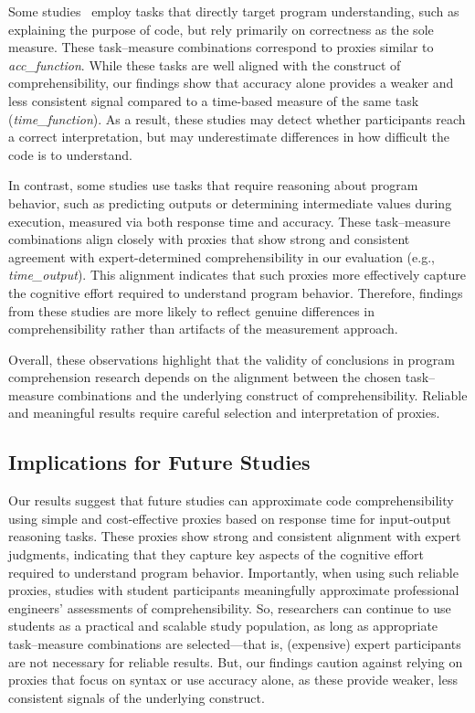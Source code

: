 Some studies~\cite{S24, S35, S38} employ tasks that directly target program
understanding, such as explaining the purpose of code, but rely
primarily on correctness as the sole measure. These task–measure
combinations correspond to proxies similar to \emph{acc\_function}.
While these tasks are well aligned with the construct of
comprehensibility, our findings show that accuracy alone provides
a weaker and less consistent signal compared to a time-based measure
of the same task (\ie \emph{time\_function}).
As a result, these studies may
detect whether participants reach a correct interpretation, but
may underestimate differences in how difficult the code is to
understand.

In contrast, some studies \cite{S39, S48, S50, S57, S59, S60} 
use tasks that require reasoning
about program behavior, such as predicting outputs or determining
intermediate values during execution, measured via both response
time and accuracy.
These task–measure combinations align closely with proxies that
show strong and consistent agreement with expert-determined
comprehensibility in our evaluation (e.g., \emph{time\_output}).
This alignment indicates that such proxies more effectively capture
the cognitive effort required to understand program behavior.
Therefore, findings from these studies are more likely to reflect
genuine differences in comprehensibility rather than artifacts of
the measurement approach.

Overall, these observations highlight that the validity of conclusions
in program comprehension research depends on the
alignment between the chosen task–measure combinations and the
underlying construct of comprehensibility.
Reliable and meaningful results require careful selection and interpretation of proxies.


\subsection{Implications for Future Studies}
\label{sec:future-work}

Our results suggest that future studies can approximate code
comprehensibility using simple and cost-effective proxies
based on response time for input-output
reasoning tasks. These proxies show strong and consistent
alignment with expert judgments, indicating that they capture
key aspects of the cognitive effort required to understand
program behavior.
Importantly, when using such reliable proxies, studies with
student participants meaningfully approximate
professional engineers’ assessments of comprehensibility. So,
researchers can continue to use students as a practical and scalable
study population, as long as appropriate task–measure
combinations are selected---that is, (expensive) expert participants are not necessary for reliable results.
But, our findings caution
against relying on proxies that focus on syntax or use accuracy
alone, as these provide weaker, less consistent signals of the
underlying construct.

